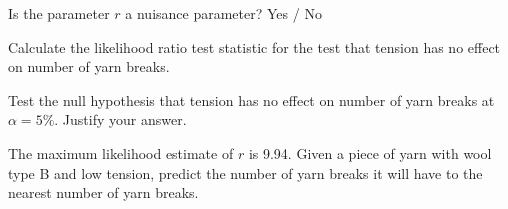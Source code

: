 \documentclass[12pt]{article}
\begin{document}
\begin{enumerate}[(a)]

 Is the parameter $r$ a nuisance parameter? Yes / No 

 Calculate the likelihood ratio test statistic for the test that tension has no effect on number of yarn breaks. 

 Test the null hypothesis that tension has no effect on number of yarn breaks at $\alpha=5\%$. Justify your answer. 

 The maximum likelihood estimate of $r$ is 9.94. Given a piece of yarn with wool type B and low tension, predict the number of yarn breaks it will have to the nearest number of yarn breaks. 


\end{enumerate}
\end{document}

